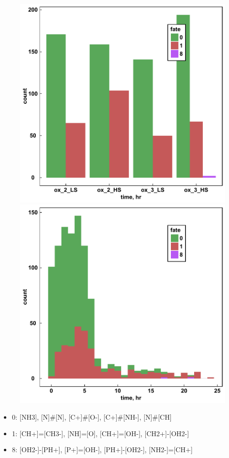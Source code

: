 \documentclass[xcolor=dvipsnames]{beamer}
\begin{document}
\begin{frame}
\begin{figure}[ht]
\begin{minipage}[b]{0.5\linewidth}
		\includegraphics[width=.6\linewidth]{img/fateBytype.pdf} 
	\end{minipage}%
	\begin{minipage}[b]{0.5\linewidth}
		\centering
		\includegraphics[width=.6\linewidth]{img/timeByfate.pdf} 
	\end{minipage} 
\end{figure}
\end{frame}


\begin{frame}
\begin{itemize}
\item 0: [NH3], [N]\#[N], [C+]\#[O-], [C+]\#[NH-], [N]\#[CH]
\item 1: [CH+]=[CH3-], [NH]=[O], [CH+]=[OH-], [CH2+]-[OH2-]
\item 8: [OH2-]-[PH+], [P+]=[OH-], [PH+]-[OH2-], [NH2-]=[CH+]
\end{itemize}
\end{frame}
\end{document}

